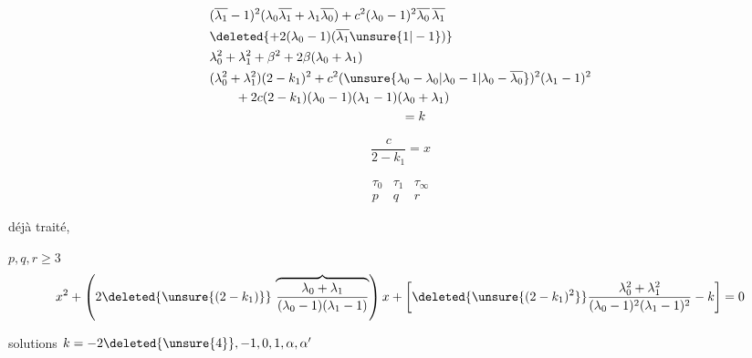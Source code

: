 \[
\begin{aligned}
&(\overline{\lambda_1}-1)^2(\lambda_0\overline{\lambda_1}+\lambda_1\overline{\lambda_0})
+c^2(\lambda_0-1)^2\overline{\lambda_0}\,\overline{\lambda_1}\\
&\deleted{+2(\lambda_0-1)(\overline{\lambda_1}\unsure{1|-1})}\\
&\lambda_0^2+\lambda_1^2+\beta^2+2\beta(\lambda_0+\lambda_1)\\
&(\lambda_0^2+\lambda_1^2)(2-k_1)^2+c^2(\unsure{\lambda_0-\lambda_0|\lambda_0-1|\lambda_0-\overline{\lambda_0}})^2(\lambda_1-1)^2\\
&\qquad+2c(2-k_1)(\lambda_0-1)(\lambda_1-1)(\lambda_0+\lambda_1)\\
&\hspace{15em}=k
\end{aligned}
\]

\[
\frac c{2-k_1}=x
\]

\[
\begin{array}{ccc}
\tau_0&\tau_1&\tau_\infty\\p&q&r
\end{array}
\]


déjà traité,

$p,q,r\geq3$
\[
x^2+\left(2\deleted{\unsure{(2-k_1)}}\,
\overbrace{\frac{\lambda_0+\lambda_1}{(\lambda_0-1)(\lambda_1-1)}}\right)x+
\left[\deleted{\unsure{(2-k_1)^2}}\frac{\lambda_0^2+\lambda_1^2}{(\lambda_0-1)^2(\lambda_1-1)^2}-k\right]=0
\]

solutions \qquad $k=-2\deleted{\unsure{4}},-1,0,1,\alpha,\alpha'$

